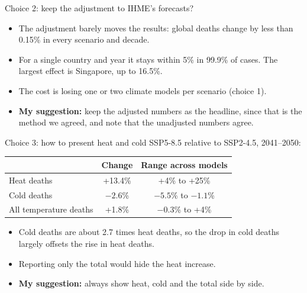 \documentclass[aspectratio=169,11pt]{beamer}
\begin{document}
\begin{frame}{Choice 2: keep the adjustment to IHME's forecasts?}
  \begin{itemize}
    \item The adjustment barely moves the results: global deaths change by
      less than 0.15\% in every scenario and decade.
    \item For a single country and year it stays within 5\% in 99.9\% of
      cases. The largest effect is Singapore, up to 16.5\%.
    \item The cost is losing one or two climate models per scenario
      (choice 1).
    \item \textbf{My suggestion:} keep the adjusted numbers as the headline,
      since that is the method we agreed, and note that the unadjusted
      numbers agree.
  \end{itemize}
\end{frame}

\begin{frame}{Choice 3: how to present heat and cold}
  SSP5-8.5 relative to SSP2-4.5, 2041--2050:

  \medskip
  \centering
  \begin{tabular}{lcc}
    \toprule
    & Change & Range across models \\
    \midrule
    Heat deaths & +13.4\% & +4\% to +25\% \\
    Cold deaths & $-2.6$\% & $-5.5$\% to $-1.1$\% \\
    All temperature deaths & +1.8\% & $-0.3$\% to +4\% \\
    \bottomrule
  \end{tabular}

  \medskip
  \raggedright
  \begin{itemize}
    \item Cold deaths are about 2.7 times heat deaths, so the drop in cold
      deaths largely offsets the rise in heat deaths.
    \item Reporting only the total would hide the heat increase.
    \item \textbf{My suggestion:} always show heat, cold and the total side by
      side.
  \end{itemize}
\end{frame}
\end{document}
